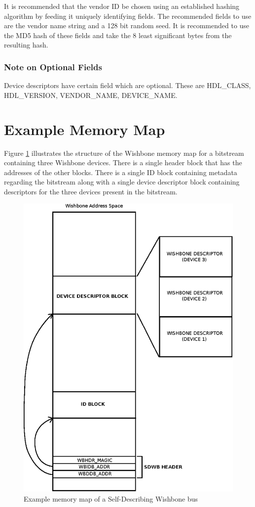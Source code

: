 \documentclass[a4paper, 12pt]{article}
\begin{document}
It is recommended that the vendor ID be chosen using an established 
hashing algorithm by feeding it uniquely identifying fields. The
recommended fields to use are the vendor name string and a 128 bit random
seed. It is recommended to use the MD5 hash of these fields and take the
8 least significant bytes from the resulting hash.

\subsubsection{Note on Optional Fields}
Device descriptors have certain field which are optional. These are HDL\_CLASS,
HDL\_VERSION, VENDOR\_NAME, DEVICE\_NAME.

\section{Example Memory Map}

Figure \ref{fig:wbmap} illustrates the
structure of the Wishbone memory map for a bitstream containing three Wishbone
devices. There is a single header block that has the addresses of the other
blocks. There is a single ID block containing metadata regarding the bitstream
along with a single device descriptor block containing descriptors for the three
devices present in the bitstream.

\begin{figure}[!ht]
	\centering
	\includegraphics{wbmap.eps}
	\caption{Example memory map of a Self-Describing Wishbone bus}
	\label{fig:wbmap}
\end{figure}
\end{document}
